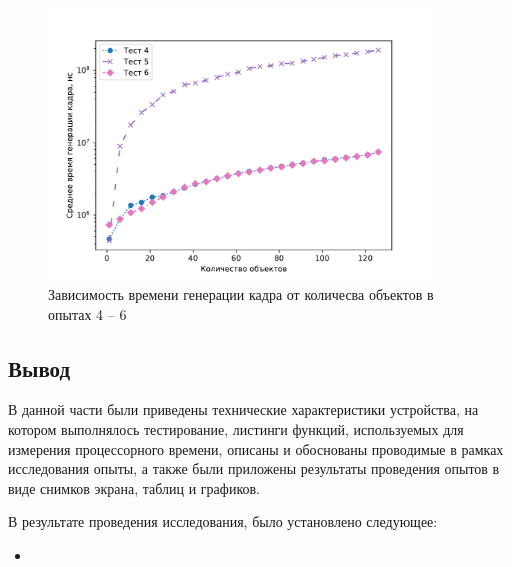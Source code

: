 \begin{figure}[H]
	\centering
    \includegraphics[width=0.9\textwidth]{img/456/plot_time.pdf}
	\caption{Зависимость времени генерации кадра от количесва объектов в опытах 4 -- 6}
	\label{fig:456:time}
\end{figure}



\subsection*{Вывод}

В данной части были приведены технические характеристики устройства, на котором выполнялось тестирование, листинги функций, используемых для измерения процессорного времени, описаны и обоснованы проводимые в рамках исследования опыты, а также были приложены результаты проведения опытов в виде снимков экрана, таблиц и графиков.

В результате проведения исследования, было установлено следующее:
\begin{itemize}
    \item 
\end{itemize}


